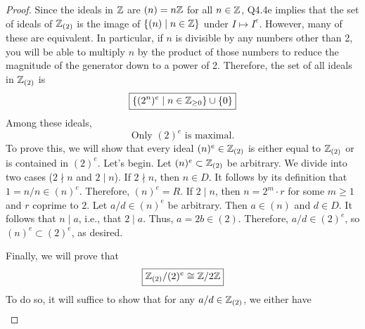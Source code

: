 \documentclass[../psets.tex]{subfiles}
\begin{document}
\begin{enumerate}
\begin{enumerate}[label={(\alph*)}]
\begin{proof}



            Since the ideals in $\mathbb{Z}$ are $(n)=n\mathbb{Z}$ for all $n\in\mathbb{Z}$, Q4.4e implies that the set of ideals of $\mathbb{Z}_{(2)}$ is the image of $\{(n)\mid n\in\mathbb{Z}\}$ under $I\mapsto I^e$. However, many of these are equivalent. In particular, if $n$ is divisible by any numbers other than 2, you will be able to multiply $n$ by the product of those numbers to reduce the magnitude of the generator down to a power of 2. Therefore, the set of all ideals in $\mathbb{Z}_{(2)}$ is
            \begin{equation*}
                \boxed{\{(2^n)^e\mid n\in{\mathbb{Z}_{\geq 0}}\}\cup\{0\}}
            \end{equation*}
            Among these ideals,
            \begin{equation*}
                \boxed{\text{Only }(2)^e\text{ is maximal.}}
            \end{equation*}
            To prove this, we will show that every ideal $(n)^e\in\mathbb{Z}_{(2)}$ is either equal to $\mathbb{Z}_{(2)}$ or is contained in $(2)^e$. Let's begin. Let $(n)^e\subset\mathbb{Z}_{(2)}$ be arbitrary. We divide into two cases ($2\nmid n$ and $2\mid n$). If $2\nmid n$, then $n\in D$. It follows by its definition that $1=n/n\in(n)^e$. Therefore, $(n)^e=R$. If $2\mid n$, then $n=2^m\cdot r$ for some $m\geq 1$ and $r$ coprime to $2$. Let $a/d\in(n)^e$ be arbitrary. Then $a\in(n)$ and $d\in D$. It follows that $n\mid a$, i.e., that $2\mid a$. Thus, $a=2b\in(2)$. Therefore, $a/d\in(2)^e$, so $(n)^e\subset(2)^e$, as desired.\par
            Finally, we will prove that
            \begin{equation*}
                \boxed{\mathbb{Z}_{(2)}/(2)^e \cong \mathbb{Z}/2\mathbb{Z}}
            \end{equation*}
            To do so, it will suffice to show that for any $a/d\in\mathbb{Z}_{(2)}$, we either have
            \begin{align*}

\end{align*}
\end{proof}
\end{enumerate}
\end{enumerate}
\end{document}
